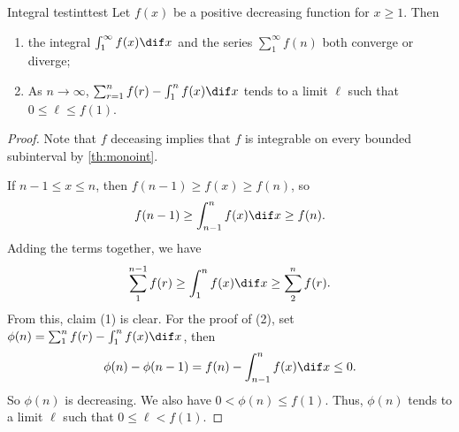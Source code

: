 \begin{theorem}{Integral test}{inttest}
    Let \(f(x)\) be a positive decreasing function for \(x \geq 1\). Then
    \begin{enumerate}
        \item the integral \(\int^\infty_1 f(x) \dif x\) and the series \(\sum^\infty_1 f(n)\) both converge or diverge;
        \item As \(n \to \infty\), \(\sum_{r=1}^{n} f(r) - \int_{1}^{n} f(x) \dif x\) tends to a limit \(\ell\) such that \(0 \leq \ell \leq f(1)\).
    \end{enumerate}
\end{theorem}
\begin{proof}
    Note that \(f\) deceasing implies that \(f\) is integrable on every bounded subinterval by \cref{th:monoint}.

    If \(n  - 1 \leq x \leq n\), then \(f(n-1) \geq f(x) \geq f(n)\), so
    \[
        f(n - 1) \geq \int^n_{n-1}f(x) \dif x \geq f(n).
    \]
    Adding the terms together, we have
    \[
        \sum_1^{n-1} f(r) \geq \int^n_1 f(x) \dif x \geq \sum^n_2 f(r).
    \]
    From this, claim (1) is clear. For the proof of (2), set \(\phi(n) = \sum^n_1 f(r) - \int^n_1 f(x) \dif x\), then
    \[
        \phi(n) - \phi(n-1) = f(n) - \int^n_{n-1} f(x) \dif x\leq 0.
    \]
    So \(\phi(n)\) is decreasing. We also have \(0 < \phi(n) \leq f(1)\). Thus, \(\phi(n)\) tends to a limit \(\ell\) such that \(0 \leq \ell < f(1)\).
\end{proof}